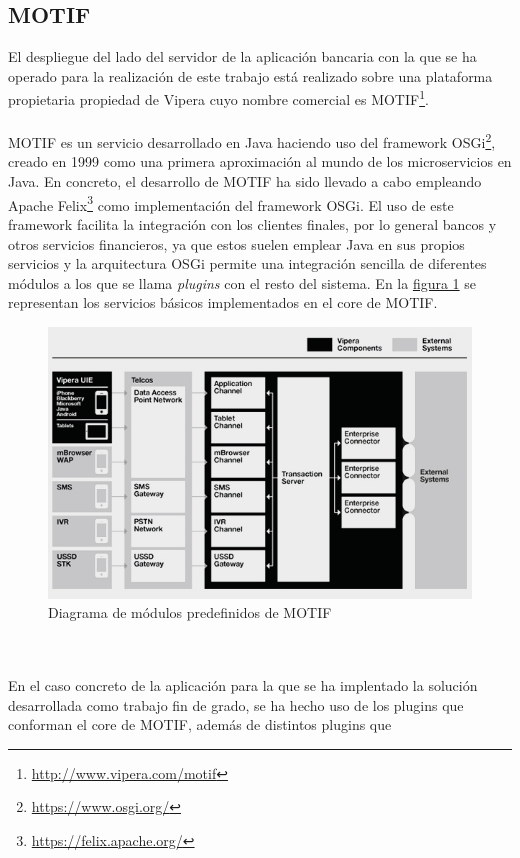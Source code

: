 \documentclass[a4paper, 12pt]{article}
\begin{document}
\subsection{MOTIF}
\label{sec-2-2}
El despliegue del lado del servidor de la aplicación bancaria con la que se ha operado
para la realización de este trabajo está realizado sobre una plataforma propietaria propiedad
de Vipera cuyo nombre comercial es MOTIF\footnote{\url{http://www.vipera.com/motif}}.
\\
\\
MOTIF es un servicio desarrollado en Java haciendo uso del framework OSGi\footnote{\url{https://www.osgi.org/}}, creado en 1999
como una primera aproximación al mundo de los microservicios en Java. En concreto, el desarrollo de MOTIF
ha sido llevado a cabo empleando Apache Felix\footnote{\url{https://felix.apache.org/}} como implementación del framework OSGi. El uso de
este framework facilita la integración con los clientes finales, por lo general bancos y otros servicios
financieros, ya que estos suelen emplear Java en sus propios servicios y la arquitectura OSGi permite una
integración sencilla de diferentes módulos a los que se llama \emph{plugins} con el resto del sistema. En la \hyperref[fig:motif-core]{figura 1}
se representan los servicios básicos implementados en el core de MOTIF.
\begin{figure}[htb]
\centering
\includegraphics[width=.9\linewidth]{./images/motif.jpg}
\caption{\label{fig:motif-core}Diagrama de módulos predefinidos de MOTIF}
\end{figure}
\\
\\
En el caso concreto de la aplicación para la que se ha implentado la solución desarrollada como trabajo
fin de grado, se ha hecho uso de los plugins que conforman el core de MOTIF, además de distintos plugins que
\end{document}
